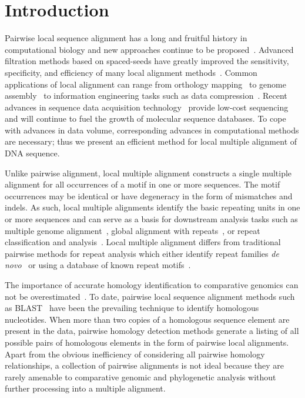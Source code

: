 \documentclass[10pt,journal,letterpaper,compsoc,peerreview]{IEEEtran}
\begin{document}
\IEEEpeerreviewmaketitle
\section{Introduction}
Pairwise local sequence alignment has a long and fruitful history
in computational biology and new approaches continue to be
proposed~\cite{ref-pattern,ref-chaos,ref-yass,ref-kahveciMAP}.
Advanced filtration methods based on spaced-seeds have greatly
improved the sensitivity, specificity, and efficiency of many
local alignment
methods~\cite{ref-zhang04,ref-zhang06,ref-buhler05,ref-xu04,ref-batzoglouNAR}.
Common applications of local alignment can range from orthology
mapping~\cite{ref-orthomcl} to genome assembly~\cite{ref-arachne2}
to information engineering tasks such as data
compression~\cite{ref-ane}. Recent advances in sequence data
acquisition technology~\cite{ref-454, sequencing, hybrid} provide low-cost sequencing
and will continue to fuel the growth of molecular sequence
databases. To cope with advances in data volume, corresponding
advances in computational methods are necessary; thus we present
an efficient method for local multiple alignment of DNA sequence.

Unlike pairwise alignment, local multiple alignment constructs a
single multiple alignment for all occurrences of a motif in one or
more sequences.  The motif occurrences may be identical or have
degeneracy in the form of mismatches and indels.  As such, local
multiple alignments identify the basic repeating units in one or
more sequences and can serve as a basis for downstream analysis
tasks such as multiple genome
alignment~\cite{ref-mauve,ref-mga,ref-mgcat,ref-deweyReview}, global
alignment with repeats~\cite{ref-otherSammethPaper,ref-aba}, or
repeat classification and analysis~\cite{ref-piler}.  Local multiple
alignment differs from traditional pairwise methods for repeat
analysis which either identify repeat families \textit{de
novo}~\cite{ref-reputer} or using a database of known repeat
motifs~\cite{ref-repbase}.

The importance of accurate homology identification to comparative
genomics can not be overestimated~\cite{Kumar07}. To date, pairwise
local sequence alignment
methods such as BLAST~\cite{ref-blastz,ref-ssearch} have been the
prevailing technique to identify homologous nucleotides.  When more
than two copies of a homologous sequence element are present in the
data, pairwise homology detection methods generate a listing of all
possible pairs of homologous elements in the form of pairwise local
alignments.  Apart from the obvious inefficiency of considering all
pairwise homology relationships, a collection of pairwise alignments
is not ideal because they are rarely amenable to comparative genomic
and phylogenetic analysis without further processing into a multiple
alignment.
\end{document}
